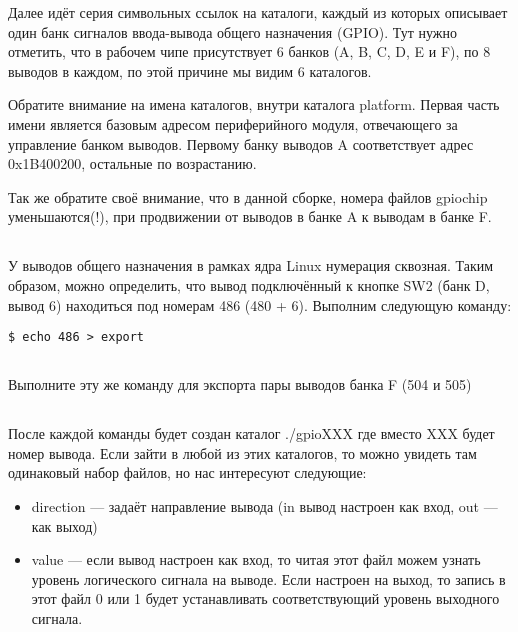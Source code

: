 Далее идёт серия символьных ссылок на каталоги, каждый из которых описывает один банк сигналов ввода-вывода общего назначения (GPIO). Тут нужно отметить, что в рабочем чипе присутствует 6 банков (A, B, C, D, E и F), по 8 выводов в каждом, по этой причине мы видим 6 каталогов.  

Обратите внимание на имена каталогов, внутри каталога platform. Первая часть имени является базовым адресом периферийного модуля, отвечающего за управление банком выводов. Первому банку выводов A соответствует адрес 0x1B400200, остальные по возрастанию. 

Так же обратите своё внимание, что в данной сборке, номера файлов gpiochip уменьшаются(!), при продвижении от выводов в банке A к выводам в банке F.

\subsection{}У выводов общего назначения в рамках ядра Linux нумерация сквозная. Таким образом, можно определить, что вывод подключённый к кнопке SW2 (банк D, вывод 6) находиться под номерам 486 (480 + 6).  Выполним следующую команду:
\begin{lstlisting}[style=bash]
$ echo 486 > export
\end{lstlisting}

\subsection{}Выполните эту же команду для экспорта пары выводов банка F (504 и 505) 

\subsection{}После каждой команды будет создан каталог ./gpioXXX где вместо XXX будет номер вывода. Если зайти в любой из этих каталогов, то можно увидеть там одинаковый набор файлов, но нас интересуют следующие: 
\begin{itemize}
\item direction — задаёт направление вывода (in вывод настроен как вход, out — как выход)
\item value — если вывод настроен как вход, то читая этот файл можем узнать уровень логического сигнала на выводе. Если настроен на выход, то запись в этот файл 0 или 1 будет устанавливать соответствующий уровень выходного сигнала.
\end{itemize}

